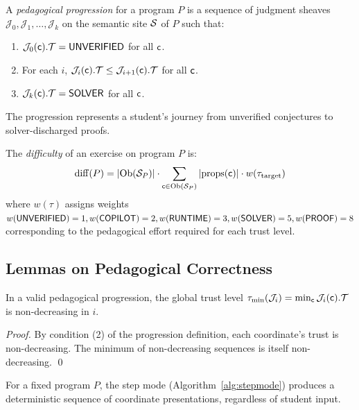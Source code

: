 \documentclass[11pt]{article}
\begin{document}
\begin{definition}
A \emph{pedagogical progression} for a program $P$ is a sequence of
judgment sheaves $\mathcal{J}_0, \mathcal{J}_1, \ldots, \mathcal{J}_k$
on the semantic site $\mathcal{S}$ of $P$ such that:
\begin{enumerate}
  \item $\mathcal{J}_0(\mathsf{c}).\mathcal{T} = \mathsf{UNVERIFIED}$ for all $\mathsf{c}$.
  \item For each $i$, $\mathcal{J}_i(\mathsf{c}).\mathcal{T} \leq
        \mathcal{J}_{i+1}(\mathsf{c}).\mathcal{T}$ for all $\mathsf{c}$.
  \item $\mathcal{J}_k(\mathsf{c}).\mathcal{T} = \mathsf{SOLVER}$ for all $\mathsf{c}$.
\end{enumerate}
The progression represents a student's journey from unverified conjectures
to solver-discharged proofs.
\end{definition}

\begin{definition}
The \emph{difficulty} of an exercise on program $P$ is:
\[
  \mathrm{diff}(P) = |\mathrm{Ob}(\mathcal{S}_P)| \cdot \sum_{\mathsf{c} \in \mathrm{Ob}(\mathcal{S}_P)}
    |\mathrm{props}(\mathsf{c})| \cdot w(\tau_{\text{target}})
\]
where $w(\tau)$ assigns weights $w(\mathsf{UNVERIFIED}) = 1, w(\mathsf{COPILOT}) = 2,
w(\mathsf{RUNTIME}) = 3, w(\mathsf{SOLVER}) = 5, w(\mathsf{PROOF}) = 8$ corresponding to the
pedagogical effort required for each trust level.
\end{definition}

\subsection{Lemmas on Pedagogical Correctness}

\begin{lemma}\label{lem:prog-mono}
In a valid pedagogical progression, the global trust level
$\tau_{\min}(\mathcal{J}_i) = \min_{\mathsf{c}} \mathcal{J}_i(\mathsf{c}).\mathcal{T}$
is non-decreasing in $i$.
\end{lemma}

\begin{proof}
By condition (2) of the progression definition, each coordinate's trust is
non-decreasing. The minimum of non-decreasing sequences is itself
non-decreasing. \qed
\end{proof}

\begin{lemma}\label{lem:step-det}
For a fixed program $P$, the step mode (Algorithm~\ref{alg:stepmode})
produces a deterministic sequence of coordinate presentations, regardless
of student input.
\end{lemma}
\end{document}
